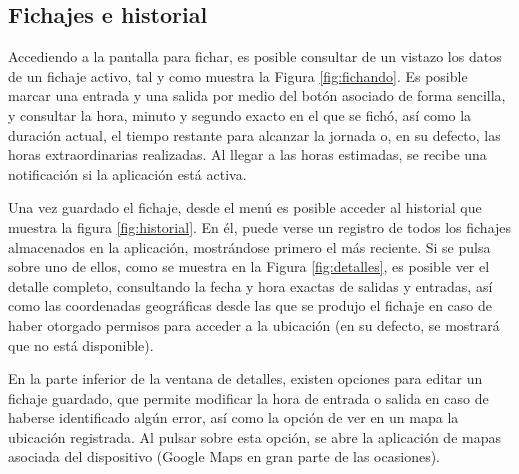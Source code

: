 \subsection{Fichajes e historial}

Accediendo a la pantalla para fichar, es posible consultar de un vistazo los datos de un fichaje activo, tal y como muestra la Figura \ref{fig:fichando}. Es posible marcar una entrada y una salida por medio del botón asociado de forma sencilla, y consultar la hora, minuto y segundo exacto en el que se fichó, así como la duración actual, el tiempo restante para alcanzar la jornada o, en su defecto, las horas extraordinarias realizadas. Al llegar a las horas estimadas, se recibe una notificación si la aplicación está activa.

Una vez guardado el fichaje, desde el menú es posible acceder al historial que muestra la figura \ref{fig:historial}. En él, puede verse un registro de todos los fichajes almacenados en la aplicación, mostrándose primero el más reciente. Si se pulsa sobre uno de ellos, como se muestra en la Figura \ref{fig:detalles}, es posible ver el detalle completo, consultando la fecha y hora exactas de salidas y entradas, así como las coordenadas geográficas desde las que se produjo el fichaje en caso de haber otorgado permisos para acceder a la ubicación (en su defecto, se mostrará que no está disponible).

En la parte inferior de la ventana de detalles, existen opciones para editar un fichaje guardado, que permite modificar la hora de entrada o salida en caso de haberse identificado algún error, así como la opción de ver en un mapa la ubicación registrada. Al pulsar sobre esta opción, se abre la aplicación de mapas asociada del dispositivo (Google Maps en gran parte de las ocasiones).

